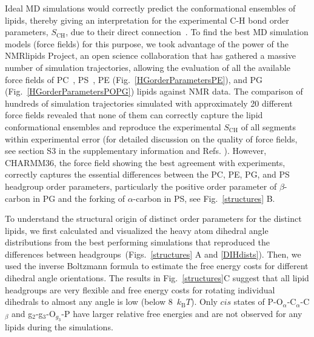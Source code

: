 \documentclass[journal=jpcbfk,manuscript=article]{achemso}
\begin{document}
Ideal
MD simulations would correctly predict the conformational ensembles of lipids, thereby giving an interpretation for  the experimental C-H bond order parameters, $S_\mathrm{CH}$, due to their direct connection~\cite{ollila16}. To find the best MD simulation models (force fields) for this purpose, we took advantage of the power of the NMRlipids Project, an open science collaboration that has gathered a massive number of simulation trajectories, allowing the evaluation of all the available force fields of PC~\cite{botan15}, PS~\cite{antila19}, PE (Fig.~\ref{HGorderParametersPE}), and PG (Fig.~\ref{HGorderParametersPOPG}) lipids against NMR data. The comparison of hundreds of simulation trajectories simulated with approximately 20 different force fields revealed that none of them can correctly capture the lipid conformational ensembles and reproduce the experimental $S_\mathrm{CH}$ of all segments within experimental error (for detailed discussion on the quality of force fields, see section S3 in the supplementary information and Refs. ). However, CHARMM36, the force field showing the best agreement with experiments, correctly captures the essential differences between the PC, PE, PG, and PS headgroup order parameters, particularly the positive order parameter of $\beta$-carbon in PG and the forking of $\alpha$-carbon in PS, see Fig.~\ref{structures} B. 

To understand the structural origin of distinct order parameters for the distinct lipids,
we first calculated and visualized the heavy atom dihedral angle distributions from the best performing simulations that reproduced the differences between headgroups~(Figs.~\ref{structures} A and \ref{DIHdists}).
Then, we used the inverse Boltzmann formula to estimate the free
energy costs for different dihedral angle orientations.
The results in Fig.~\ref{structures}C suggest that all lipid headgroups are very flexible and free
energy costs for rotating individual dihedrals to almost any angle is low (below 8~$k_\mathrm{B}T$).
Only $cis$ states of P-O$_\alpha$-C$_\alpha$-C$_\beta$ and g$_2$-g$_3$-O$_{g_3}$-P have larger relative free
energies and are not observed for any lipids during the simulations.
\end{document}
